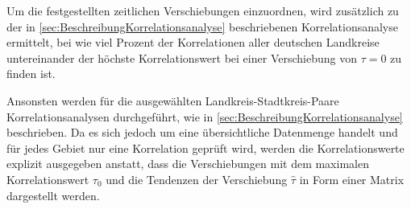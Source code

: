 Um die festgestellten zeitlichen Verschiebungen einzuordnen, wird zusätzlich zu der in \autoref{sec:BeschreibungKorrelationsanalyse} beschriebenen Korrelationsanalyse ermittelt, bei wie viel Prozent der Korrelationen aller deutschen Landkreise untereinander der höchste Korrelationswert bei einer Verschiebung von $\tau = 0$ zu finden ist.

Ansonsten werden für die ausgewählten Landkreis-Stadtkreis-Paare Korrelationsanalysen durchgeführt, wie in \autoref{sec:BeschreibungKorrelationsanalyse} beschrieben. Da es sich jedoch um eine übersichtliche Datenmenge handelt und für jedes Gebiet nur eine Korrelation geprüft wird, werden die Korrelationswerte explizit ausgegeben anstatt, dass die Verschiebungen mit dem maximalen Korrelationswert $\tau_0$ und die Tendenzen der Verschiebung $\hat{\tau}$ in Form einer Matrix dargestellt werden.


